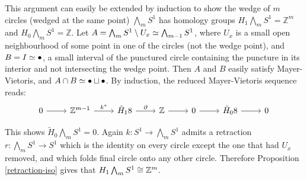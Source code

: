 \begin{example}
This argument can easily be extended by induction to show the wedge of $m$ circles (wedged at the same point) $\bigwedge_m S^1$ has homology groups $H_1\bigwedge_m S^1=\mathbb{Z}^m$ and $H_0\bigwedge_m S^1=\mathbb{Z}$. Let $A=\bigwedge_{m} S^1\setminus U_x\simeq \bigwedge_{m-1} S^1$, where $U_x$ is a small open neighbourhood of some point in one of the circles (not the wedge point), and $B=I\simeq \bullet$, a small interval of the punctured circle containing the puncture in its interior and not intersecting the wedge point. Then $A$ and $B$ easily satisfy Mayer-Vietoris, and $A\cap B\simeq \bullet \sqcup \bullet$. By induction, the reduced Mayer-Vietoris sequence reads:
\[\begin{tikzcd}
0 \arrow[r] & \mathbb{Z}^{m-1} \arrow[r, "k^*"] & \tilde{H}_18 \arrow[r, "\partial"] & \mathbb{Z} \arrow[r] & 0 \arrow[r] & \tilde{H}_08 \arrow[r] & 0
\end{tikzcd}\]

This shows $\tilde{H}_0 \bigwedge_m S^1=0$. Again  $k:S^1\rightarrow \bigwedge_m S^1$ admits a retraction $r:\bigwedge_m S^1\rightarrow S^1$ which is the identity on every circle except the one that had $U_x$ removed, and which folds final circle onto any other circle. Therefore Proposition \ref{retraction-iso} gives that $H_1 \bigwedge_m S^1\cong \mathbb{Z}^{m}$.
\end{example}

